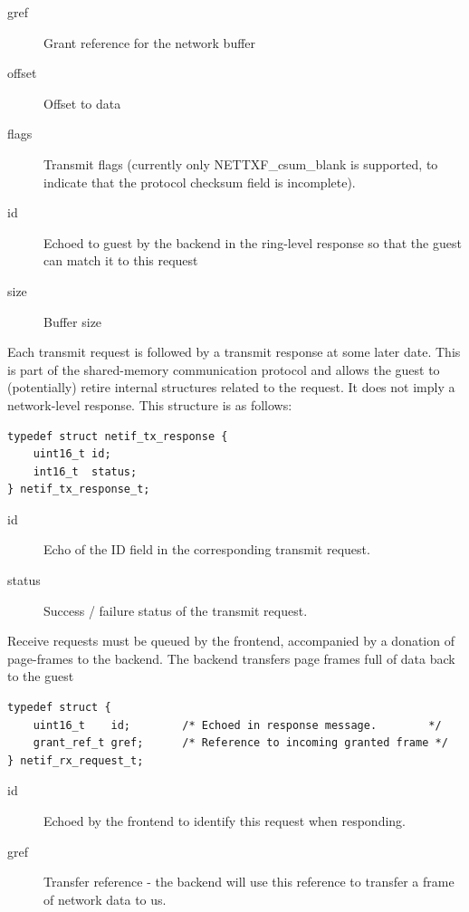 \documentclass[11pt,twoside,final,openright,a4paper]{report}
\begin{document}
\begin{description}
\item[gref] Grant reference for the network buffer
\item[offset] Offset to data
\item[flags] Transmit flags (currently only NETTXF\_csum\_blank is
  supported, to indicate that the protocol checksum field is
  incomplete).
\item[id] Echoed to guest by the backend in the ring-level response so
  that the guest can match it to this request
\item[size] Buffer size
\end{description}

Each transmit request is followed by a transmit response at some later
date.  This is part of the shared-memory communication protocol and
allows the guest to (potentially) retire internal structures related
to the request.  It does not imply a network-level response.  This
structure is as follows:

\scriptsize
\begin{verbatim}
typedef struct netif_tx_response {
    uint16_t id;
    int16_t  status;
} netif_tx_response_t;
\end{verbatim}
\normalsize

\begin{description}
\item[id] Echo of the ID field in the corresponding transmit request.
\item[status] Success / failure status of the transmit request.
\end{description}

Receive requests must be queued by the frontend, accompanied by a
donation of page-frames to the backend.  The backend transfers page
frames full of data back to the guest

\scriptsize
\begin{verbatim}
typedef struct {
    uint16_t    id;        /* Echoed in response message.        */
    grant_ref_t gref;      /* Reference to incoming granted frame */
} netif_rx_request_t;
\end{verbatim}
\normalsize

\begin{description}
\item[id] Echoed by the frontend to identify this request when
  responding.
\item[gref] Transfer reference - the backend will use this reference
  to transfer a frame of network data to us.
\end{description}
\end{document}
